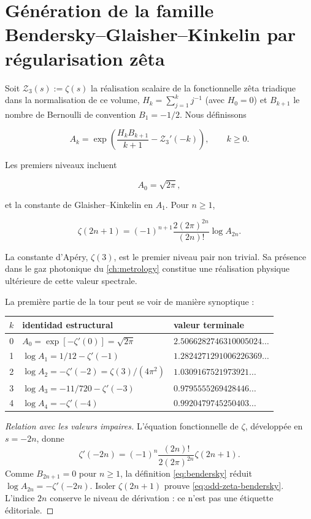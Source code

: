 \section{Génération de la famille Bendersky--Glaisher--Kinkelin par régularisation zêta}

Soit \(\mathcal Z_3(s):=\zeta(s)\) la réalisation scalaire de la fonctionnelle
zêta triadique dans la normalisation de ce volume,
\(H_k=\sum_{j=1}^k j^{-1}\) (avec \(H_0=0\)) et \(B_{k+1}\) le nombre de
Bernoulli de convention \(B_1=-1/2\). Nous définissons

\begin{equation}
A_k=\exp\!\left(
\frac{H_kB_{k+1}}{k+1}-\mathcal Z_3'(-k)
\right),\qquad k\ge0.
\label{eq:bendersky}
\end{equation}

Les premiers niveaux incluent

\[
A_0=\sqrt{2\pi},
\]

et la constante de Glaisher--Kinkelin en \(A_1\). Pour \(n\ge1\),

\begin{equation}
\zeta(2n+1)=(-1)^{n+1}
\frac{2(2\pi)^{2n}}{(2n)!}\log A_{2n}.
\label{eq:odd-zeta-bendersky}
\end{equation}

La constante d'Apéry, \(\zeta(3)\), est le premier niveau pair non trivial.
Sa présence dans le gaz photonique du \cref{ch:metrology} constitue une
réalisation physique ultérieure de cette valeur spectrale.

La première partie de la tour peut se voir de manière synoptique :
\begin{center}
\small
\begin{tabular}{@{}cll@{}}
\toprule
\(k\) & identidad estructural & valeur terminale\\
\midrule
0 & \(A_0=\exp[-\zeta'(0)]=\sqrt{2\pi}\)
  & \(2.5066282746310005024\ldots\)\\
1 & \(\log A_1=1/12-\zeta'(-1)\)
  & \(1.2824271291006226369\ldots\)\\
2 & \(\log A_2=-\zeta'(-2)=\zeta(3)/(4\pi^2)\)
  & \(1.0309167521973921\ldots\)\\
3 & \(\log A_3=-11/720-\zeta'(-3)\)
  & \(0.9795555269428446\ldots\)\\
4 & \(\log A_4=-\zeta'(-4)\)
  & \(0.9920479745250403\ldots\)\\
\bottomrule
\end{tabular}
\end{center}

\begin{proof}[Relation avec les valeurs impaires]
L'équation fonctionnelle de \(\zeta\), développée en \(s=-2n\), donne
\begin{equation}
\zeta'(-2n)=(-1)^n
\frac{(2n)!}{2(2\pi)^{2n}}\zeta(2n+1).
\label{eq:zeta-derivative-even-negative}
\end{equation}
Comme \(B_{2n+1}=0\) pour \(n\ge1\), la définition
\cref{eq:bendersky} réduit \(\log A_{2n}=-\zeta'(-2n)\). Isoler
\(\zeta(2n+1)\) prouve \cref{eq:odd-zeta-bendersky}. L'indice \(2n\)
conserve le niveau de dérivation : ce n'est pas une étiquette éditoriale.
\end{proof}

